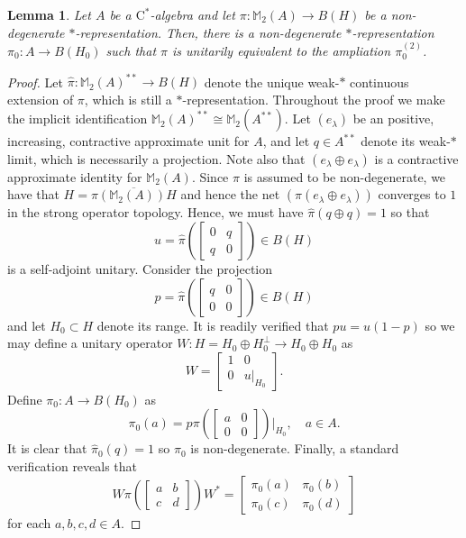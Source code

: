 \documentclass[10pt]{amsart}
\newcommand{\bM}{{\mathbb{M}}}
\newcommand{\rC}{\mathrm{C}}
\newcommand{\ol}{\overline}
\newtheorem{lemma}{Lemma}[section]
\theoremstyle{definition}
\begin{document}
\begin{lemma}\label{L:repM2}
Let $A$ be a $\rC^*$-algebra and let $\pi:\bM_2(A)\to B(H)$ be a non-degenerate $*$-representation. Then, there is a non-degenerate $*$-representation $\pi_0:A\to B(H_0)$ such that $\pi$ is unitarily equivalent to the ampliation $\pi_0^{(2)}$. 
\end{lemma}
\begin{proof}
Let  $\widehat\pi:\bM_2(A)^{**}\to B(H)$ denote the unique weak-$*$ continuous extension of $\pi$, which is still a $*$-representation. Throughout the proof we make the implicit identification $ \bM_2(A)^{**}\cong \bM_2(A^{**})$.
Let $(e_\lambda)$ be an  positive, increasing, contractive approximate unit for $A$, and let $q\in A^{**}$ denote its weak-$*$ limit, which is necessarily  a projection.  Note also that $(e_\lambda\oplus e_\lambda)$ is a contractive approximate identity for $\bM_2(A)$.  Since $\pi$ is assumed to be non-degenerate, we have that $H=\ol{\pi(\bM_2(A))H}$ and hence the net $(\pi(e_\lambda\oplus e_\lambda))$ converges to $1$ in the strong operator topology.  Hence, we must have $\widehat\pi(q\oplus q)=1$ so that
\[
u=\widehat\pi\left(\begin{bmatrix} 0 & q \\ q & 0 \end{bmatrix}\right)\in B(H)
\]
is a self-adjoint unitary. 
Consider the projection
\[
p=\widehat\pi\left(\begin{bmatrix} q & 0 \\ 0 & 0 \end{bmatrix}\right)\in B(H)
\]
and let $H_0\subset H$ denote its range. It is readily verified that $ p u =u(1-p)$ so we may define a unitary operator $W:H=H_0\oplus H_0^\perp\to H_0\oplus H_0$ as
\[
W=\begin{bmatrix} 1 & 0 \\ 0 & u|_{H_0}\end{bmatrix}.
\]
Define $\pi_0:A\to B(H_0)$ as
\[
\pi_0(a)=p\pi\left(\begin{bmatrix} a & 0 \\ 0 & 0 \end{bmatrix}\right)|_{H_0}, \quad a\in A.
\]
It is clear that $\widehat\pi_0(q)=1$ so $\pi_0$ is non-degenerate. Finally, a standard verification reveals that 
\[
W\pi\left(\begin{bmatrix} a & b \\ c & d \end{bmatrix}\right)W^*=\begin{bmatrix} \pi_0(a) & \pi_0(b) \\ \pi_0(c) & \pi_0(d) \end{bmatrix}
\]
for each $a,b,c,d\in A$.
\end{proof}
\end{document}
